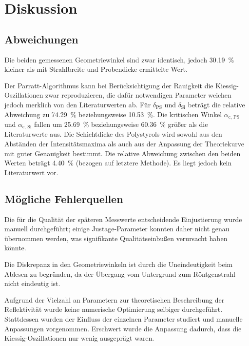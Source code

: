 \section{Diskussion}
\label{sec:diskussion}

\subsection{Abweichungen}
Die beiden gemessenen Geometriewinkel sind zwar identisch,
jedoch \SI{30.19}{\percent} kleiner als mit Strahlbreite und Probendicke ermittelte Wert.

Der Parratt-Algorithmus kann bei Berücksichtigung der Rauigkeit
die Kiessig-Oszillationen zwar reproduzieren,
die dafür notwendigen Parameter weichen jedoch merklich von den Literaturwerten ab.
Für $\delta_\text{PS}$ und $\delta_\text{Si}$ beträgt die relative Abweichung zu \cite{versuchsanleitung}
\SI{74.29}{\percent} beziehungsweise \SI{10.53}{\percent}.
Die kritischen Winkel $\alpha_\text{c, PS}$ und $\alpha_\text{c, Si}$
fallen um \SI{25.69}{\percent} beziehungsweise \SI{60.36}{\percent} größer als die Literaturwerte \cite{versuchsanleitung} aus.
Die Schichtdicke des Polystyrols wird
    sowohl aus den Abständen der Intensitätsmaxima
    als auch aus der Anpassung der Theoriekurve
mit guter Genauigkeit bestimmt.
Die relative Abweichung zwischen den beiden Werten beträgt \SI{4.40}{\percent}
    (bezogen auf letztere Methode).
Es liegt jedoch kein Literaturwert vor.


\subsection{Mögliche Fehlerquellen}
Die für die Qualität der späteren Messwerte entscheidende Einjustierung
wurde manuell durchgeführt;
einige Justage-Parameter konnten daher nicht genau übernommen werden,
was signifikante Qualitätseinbußen verursacht haben könnte.

Die Diskrepanz in den Geometriewinkeln ist durch die Uneindeutigkeit beim Ablesen zu begründen,
da der Übergang vom Untergrund zum Röntgenstrahl nicht eindeutig ist.

Aufgrund der Vielzahl an Parametern zur theoretischen Beschreibung der Reflektivität
wurde keine numerische Optimierung selbiger durchgeführt.
Stattdessen wurden der Einfluss der einzelnen Parameter studiert
und manuelle Anpassungen vorgenommen.
Erschwert wurde die Anpassung dadurch,
dass die Kiessig-Oszillationen nur wenig ausgeprägt waren.

